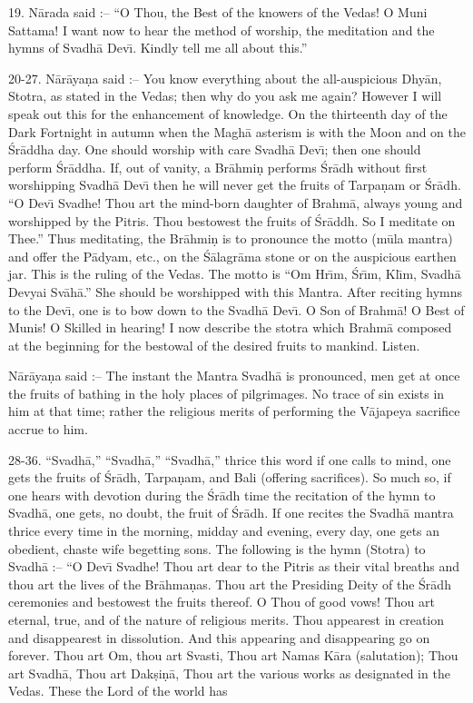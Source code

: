 19. N\=arada said :-- ``O Thou, the Best of the knowers of the Vedas! O Muni Sattama! I want now to hear the method of worship, the meditation and the hymns of Svadh\=a Dev\={\i}. Kindly tell me all about this.''

20-27. N\=ar\=aya\d{n}a said :-- You know everything about the all-auspicious Dhy\=an, Stotra, as stated in the Vedas; then why do you ask me again? However I will speak out this for the enhancement of knowledge. On the thirteenth day of the Dark Fortnight in autumn when the Magh\=a asterism is with the Moon and on the \'Sr\=addha day. One should worship with care Svadh\=a Dev\={\i}; then one should perform \'Sr\=addha. If, out of vanity, a Br\=ahmi\d{n} performs \'Sr\=adh without first worshipping Svadh\=a Dev\={\i} then he will never get the fruits of Tarpa\d{n}am or \'Sr\=adh. ``O Dev\={\i} Svadhe! Thou art the mind-born daughter of Brahm\=a, always young and worshipped by the Pitris. Thou bestowest the fruits of \'Sr\=addh. So I meditate on Thee.'' Thus meditating, the Br\=ahmi\d{n} is to pronounce the motto (m\=ula mantra) and offer the P\=adyam, etc., on the \'S\=alagr\=ama stone or on the auspicious earthen jar. This is the ruling of the Vedas. The motto is ``Om Hr\={\i}m, \'Sr\={\i}m, Kl\={\i}m, Svadh\=a Devyai Sv\=ah\=a.'' She should be worshipped with this Mantra. After reciting hymns to the Dev\={\i}, one is to bow down to the Svadh\=a Dev\={\i}. O Son of Brahm\=a! O Best of Munis! O Skilled in hearing! I now describe the stotra which Brahm\=a composed at the beginning for the bestowal of the desired fruits to mankind. Listen.

N\=ar\=aya\d{n}a said :-- The instant the Mantra Svadh\=a is pronounced, men get at once the fruits of bathing in the holy places of pilgrimages. No trace of sin exists in him at that time; rather the religious merits of performing the V\=ajapeya sacrifice accrue to him.

28-36. ``Svadh\=a,'' ``Svadh\=a,'' ``Svadh\=a,'' thrice this word if one calls to mind, one gets the fruits of \'Sr\=adh, Tarpa\d{n}am, and Bali (offering sacrifices). So much so, if one hears with devotion during the \'Sr\=adh time the recitation of the hymn to Svadh\=a, one gets, no doubt, the fruit of \'Sr\=adh. If one recites the Svadh\=a mantra thrice every time in the morning, midday and evening, every day, one gets an obedient, chaste wife begetting sons. The following is the hymn (Stotra) to Svadh\=a :-- ``O Dev\={\i} Svadhe! Thou art dear to the Pitris as their vital breaths and thou art the lives of the Br\=ahma\d{n}as. Thou art the Presiding Deity of the \'Sr\=adh ceremonies and bestowest the fruits thereof. O Thou of good vows! Thou art eternal, true, and of the nature of religious merits. Thou appearest in creation and disappearest in dissolution. And this appearing and disappearing go on forever. Thou art Om, thou art Svasti, Thou art Namas K\=ara (salutation); Thou art Svadh\=a, Thou art Dak\d{s}i\d{n}\=a, Thou art the various works as designated in the Vedas. These the Lord of the world has

